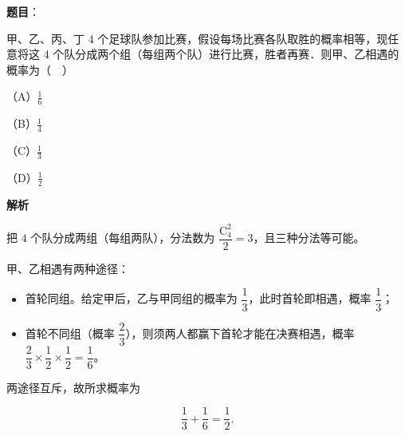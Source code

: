\begin{answer}

\textbf{题目}：

甲、乙、丙、丁 $4$ 个足球队参加比赛，假设每场比赛各队取胜的概率相等，现任意将这 $4$ 个队分成两个组（每组两个队）进行比赛，胜者再赛．则甲、乙相遇的概率为（　）

（A）$\frac16$

（B）$\frac14$

（C）$\frac13$

（D）$\frac12$

\textbf{解析}

把 $4$ 个队分成两组（每组两队），分法数为 $\dfrac{\mathrm C_4^2}{2}=3$，且三种分法等可能。

甲、乙相遇有两种途径：

\begin{itemize}
\item 首轮同组。给定甲后，乙与甲同组的概率为 $\dfrac13$，此时首轮即相遇，概率 $\dfrac13$；
\item 首轮不同组（概率 $\dfrac23$），则须两人都赢下首轮才能在决赛相遇，概率 $\dfrac23\times\dfrac12\times\dfrac12=\dfrac16$。
\end{itemize}

两途径互斥，故所求概率为

\nopagebreak[4]
\[\frac13+\frac16=\frac12.\]


\end{answer}
